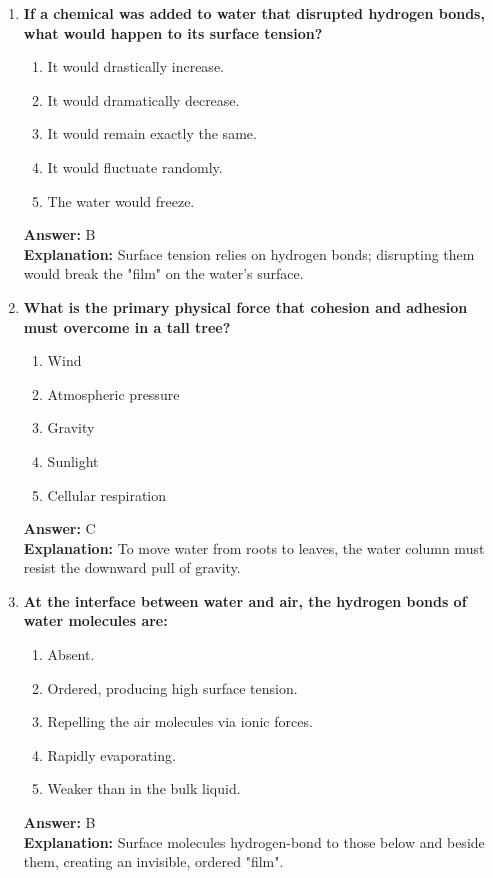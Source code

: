 \documentclass[11pt, a4paper]{article}
\begin{document}
\begin{enumerate}
\item \textbf{If a chemical was added to water that disrupted hydrogen bonds, what would happen to its surface tension?}
\begin{enumerate}[label=\Alph*.]
    \item It would drastically increase.
    \item It would dramatically decrease.
    \item It would remain exactly the same.
    \item It would fluctuate randomly.
    \item The water would freeze.
\end{enumerate}
\textbf{Answer:} B \\
\textbf{Explanation:} Surface tension relies on hydrogen bonds; disrupting them would break the "film" on the water's surface.

\item \textbf{What is the primary physical force that cohesion and adhesion must overcome in a tall tree?}
\begin{enumerate}[label=\Alph*.]
    \item Wind
    \item Atmospheric pressure
    \item Gravity
    \item Sunlight
    \item Cellular respiration
\end{enumerate}
\textbf{Answer:} C \\
\textbf{Explanation:} To move water from roots to leaves, the water column must resist the downward pull of gravity.

\item \textbf{At the interface between water and air, the hydrogen bonds of water molecules are:}
\begin{enumerate}[label=\Alph*.]
    \item Absent.
    \item Ordered, producing high surface tension.
    \item Repelling the air molecules via ionic forces.
    \item Rapidly evaporating.
    \item Weaker than in the bulk liquid.
\end{enumerate}
\textbf{Answer:} B \\
\textbf{Explanation:} Surface molecules hydrogen-bond to those below and beside them, creating an invisible, ordered "film".


\end{enumerate}
\end{document}
